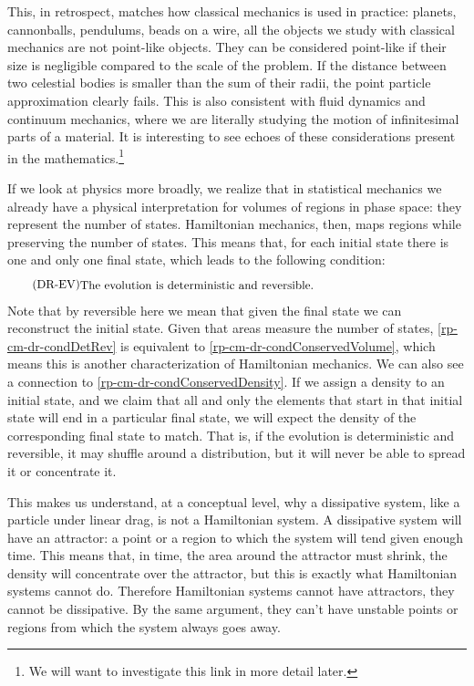 This, in retrospect, matches how classical mechanics is used in practice: planets, cannonballs, pendulums, beads on a wire, all the objects we study with classical mechanics are not point-like objects. They can be considered point-like if their size is negligible compared to the scale of the problem. If the distance between two celestial bodies is smaller than the sum of their radii, the point particle approximation clearly fails. This is also consistent with fluid dynamics and continuum mechanics, where we are literally studying the motion of infinitesimal parts of a material. It is interesting to see echoes of these considerations present in the mathematics.\footnote{We will want to investigate this link in more detail later.}

If we look at physics more broadly, we realize that in statistical mechanics we already have a physical interpretation for volumes of regions in phase space: they represent the number of states. Hamiltonian mechanics, then, maps regions while preserving the number of states. This means that, for each initial state there is one and only one final state, which leads to the following condition:
\begin{equation}\label{rp-cm-dr-condDetRev}
	\tag{DR-EV}
	\eqtext{The evolution is deterministic and reversible.}	
\end{equation}
Note that by reversible here we mean that given the final state we can reconstruct the initial state. Given that areas measure the number of states, \ref{rp-cm-dr-condDetRev} is equivalent to \ref{rp-cm-dr-condConservedVolume}, which means this is another characterization of Hamiltonian mechanics. We can also see a connection to \ref{rp-cm-dr-condConservedDensity}. If we assign a density to an initial state, and we claim that all and only the elements that start in that initial state will end in a particular final state, we will expect the density of the corresponding final state to match. That is, if the evolution is deterministic and reversible, it may shuffle around a distribution, but it will never be able to spread it or concentrate it.

This makes us understand, at a conceptual level, why a dissipative system, like a particle under linear drag, is not a Hamiltonian system. A dissipative system will have an attractor: a point or a region to which the system will tend given enough time. This means that, in time, the area around the attractor must shrink, the density will concentrate over the attractor, but this is exactly what Hamiltonian systems cannot do. Therefore Hamiltonian systems cannot have attractors, they cannot be dissipative. By the same argument, they can't have unstable points or regions from which the system always goes away.

